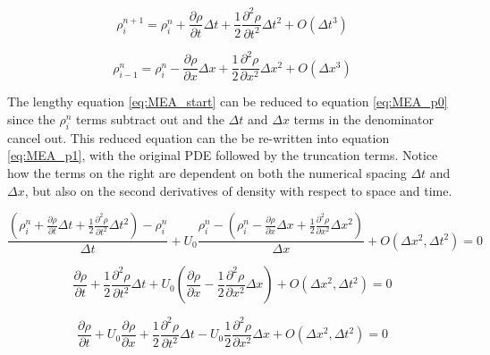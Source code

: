     \begin{equation}
    	\label{eq:rho_taylor_series_time}
    	\rho_{i}^{n+1} =  \rho_{i}^{n} + 
    	\frac{\partial \rho}{\partial t} \Delta t +
    	\frac{1}{2} \frac{\partial^2 \rho}{\partial t^2} \Delta t^2 + O(\Delta t^{3})
    \end{equation}
    
    \begin{equation}
    	\label{eq:rho_taylor_series_space}
    	\rho_{i-1}^{n} =  \rho_{i}^{n} - 
    	\frac{\partial \rho}{\partial x} \Delta x +
    	\frac{1}{2} \frac{\partial^2 \rho}{\partial x^2} \Delta x^2 + O(\Delta x^{3})
    \end{equation}
    
    The lengthy equation \ref{eq:MEA_start} can be reduced to equation
    \ref{eq:MEA_p0} since the $\rho_{i}^{n}$ terms subtract out and the $\Delta
    t$ and $\Delta x$ terms in the denominator cancel out. This reduced equation
    can the be re-written into equation \ref{eq:MEA_p1}, with the original PDE
    followed by the truncation terms. Notice how the terms on the right are
    dependent on both the numerical spacing $\Delta t$ and $\Delta x$, but also
    on the second derivatives of density with respect to space and time.
    
    \begin{equation}
    	\label{eq:MEA_start}
    	\frac{ \left( \rho_{i}^{n} + \frac{\partial \rho}{\partial t} \Delta t +
    	\frac{1}{2} \frac{\partial^2 \rho}{\partial t^2} \Delta t^2 \right)-\rho_{i}^{n} }{\Delta t} 
    	+ U_{0} \frac{\rho_{i}^{n} - \left( \rho_{i}^{n} -  \frac{\partial \rho}{\partial x} \Delta x + 
    	\frac{1}{2} \frac{\partial^2 \rho}{\partial x^2} \Delta x^2 \right)}{\Delta x} 
    	+ O(\Delta x^{2},\Delta t^{2}) 
    	= 0
    \end{equation}
    
    \begin{equation}
    	\label{eq:MEA_p0}
    	 \frac{\partial \rho}{\partial t}  + \frac{1}{2} \frac{\partial^2 \rho}{\partial t^2} \Delta t +
    	 U_{0} \left(   \frac{\partial \rho}{\partial x}  - \frac{1}{2} \frac{\partial^2 \rho}{\partial x^2} \Delta x \right) 
    	 + O(\Delta x^{2},\Delta t^{2}) 
    	 = 0
    \end{equation}
    
    \begin{equation}
    	\label{eq:MEA_p1}
    	 \frac{\partial \rho}{\partial t}  +  U_{0} \frac{\partial \rho}{\partial x} + 
    	 \frac{1}{2} \frac{\partial^2 \rho}{\partial t^2} \Delta t -
    	   U_{0}  \frac{1}{2} \frac{\partial^2 \rho}{\partial x^2} \Delta x  
    	   + O(\Delta x^{2},\Delta t^{2}) = 0 
    \end{equation} \linebreak
    
